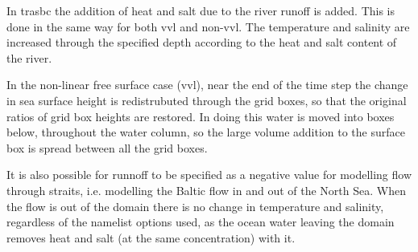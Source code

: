 \documentclass[../tex_main/NEMO_manual]{subfiles}
\begin{document}
In trasbc the addition of heat and salt due to the river runoff is added.
This is done in the same way for both vvl and non-vvl.
The temperature and salinity are increased through the specified depth according to the heat and salt content of the river. 

In the non-linear free surface case (vvl), near the end of the time step the change in sea surface height is redistrubuted 
through the grid boxes, so that the original ratios of grid box heights are restored.
In doing this water is moved into boxes below, throughout the water column, so the large volume addition to the surface box is spread between all the grid boxes.

It is also possible for runnoff to be specified as a negative value for modelling flow through straits, i.e. modelling the Baltic flow in and out of the North Sea.
When the flow is out of the domain there is no change in temperature and salinity, regardless of the namelist options used, as the ocean water leaving the domain removes heat and salt (at the same concentration) with it. 






%
\end{document}
